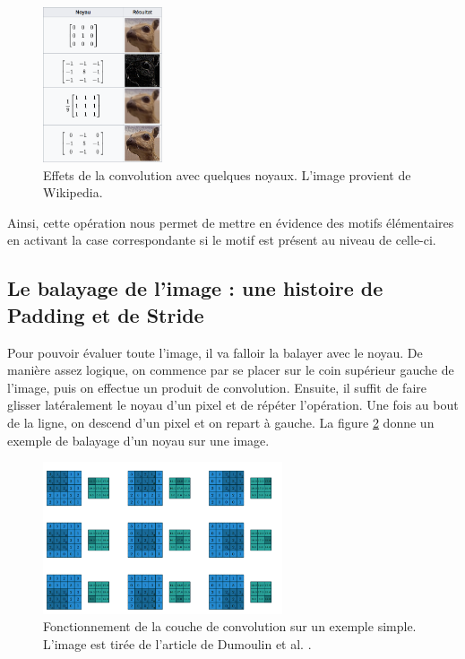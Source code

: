 \begin{figure}[!h]
\centering
\includegraphics[width=100pt]{images/cnn/chien_prairie.png} 
\caption{Effets de la convolution avec quelques noyaux. L'image provient de Wikipedia.}
\label{chien_prairie}
\end{figure}

Ainsi, cette opération nous permet de mettre en évidence des motifs élémentaires en activant la case correspondante si le motif est présent au niveau de celle-ci.

\subsection{Le balayage de l'image : une histoire de Padding et de Stride}

Pour pouvoir évaluer toute l'image, il va falloir la balayer avec le noyau. De manière assez logique, on commence par se placer sur le coin supérieur gauche de l'image, puis on effectue un produit de convolution. Ensuite, il suffit de faire glisser latéralement le noyau d'un pixel et de répéter l'opération. Une fois au bout de la ligne, on descend d'un pixel et on repart à gauche. La figure \ref{convolution} donne un exemple de balayage d'un noyau sur une image.

\begin{figure}[!h]
\centering
\includegraphics[width=200pt]{images/cnn/convolution.png}
\caption{Fonctionnement de la couche de convolution sur un exemple simple. L'image est tirée de l'article de Dumoulin et al. \cite{dumoulin_guide_2018}.}
\label{convolution}
\end{figure}

